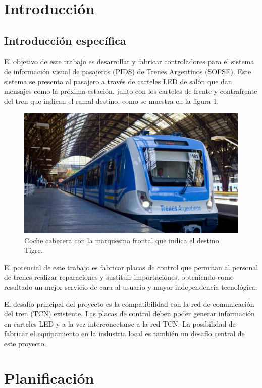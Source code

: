 \documentclass[
11pt, %
]{charter}
\begin{document}
\pagebreak


\section{Introducción}
\label{sec:intro}
\subsection{Introducción específica}
El objetivo de este trabajo es desarrollar y fabricar controladores para el sistema de información visual de pasajeros (PIDS) de Trenes Argentinos (SOFSE). Este sistema se presenta al pasajero a través de carteles LED de salón que dan mensajes como la próxima estación, junto con los carteles de frente y contrafrente del tren que indican el ramal destino, como se muestra en la figura 1. 

\begin{figure}[htpb]
\centering 
\includegraphics[width=.75\textwidth]{./Pics/tren.jpg}
\caption{Coche cabecera con la marquesina frontal que indica el destino Tigre.}
\label{fig:cartelFrente}
\end{figure}

El potencial de este trabajo es fabricar placas de control que permitan al personal de trenes realizar reparaciones y sustituir importaciones, obteniendo como resultado un mejor servicio de cara al usuario y mayor independencia tecnológica.

El desafío principal del proyecto es la compatibilidad con la red de comunicación del tren (TCN) existente. Las placas de control deben poder generar información en carteles LED y a la vez interconectarse a la red TCN. La posibilidad de fabricar el equipamiento en la industria local es también un desafío central de este proyecto.

\pagebreak

\section{Planificación}
\end{document}
